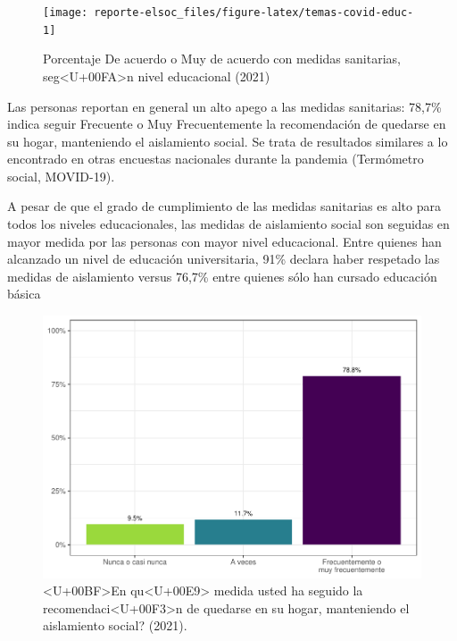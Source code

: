 \documentclass[
  12pt,
]{book}
\begin{document}
\begin{figure}

{\centering \texttt{[image: reporte-elsoc\_files/figure-latex/temas-covid-educ-1]} 

}

\caption{Porcentaje De acuerdo o Muy de acuerdo con medidas sanitarias, seg<U+00FA>n nivel educacional (2021)}\label{fig:temas-covid-educ}
\end{figure}

Las personas reportan en general un alto apego a las medidas sanitarias: 78,7\% indica seguir Frecuente o Muy Frecuentemente la recomendación de quedarse en su hogar, manteniendo el aislamiento social. Se trata de resultados similares a lo encontrado en otras encuestas nacionales durante la pandemia (Termómetro social, MOVID-19).

A pesar de que el grado de cumplimiento de las medidas sanitarias es alto para todos los niveles educacionales, las medidas de aislamiento social son seguidas en mayor medida por las personas con mayor nivel educacional. Entre quienes han alcanzado un nivel de educación universitaria, 91\% declara haber respetado las medidas de aislamiento versus 76,7\% entre quienes sólo han cursado educación básica

\begin{figure}

{\centering \includegraphics{reporte-elsoc_files/figure-latex/dist-total-1} 

}

\caption{<U+00BF>En qu<U+00E9> medida usted ha seguido la recomendaci<U+00F3>n de quedarse en su hogar, manteniendo el aislamiento social? (2021).}\label{fig:dist-total}
\end{figure}
\end{document}
